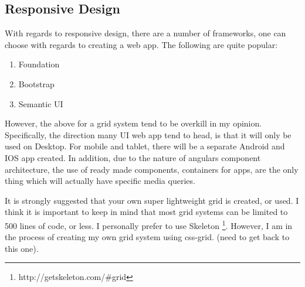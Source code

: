 \subsection{ Responsive Design }
With regards to responsive design, there are a number of frameworks, one can
choose with regards to creating a web app. The following are quite popular:
\begin{enumerate}
  \item Foundation
  \item Bootstrap
  \item Semantic UI
\end{enumerate}

However, the above for a grid system tend to be overkill in my opinion.
Specifically, the direction many UI web app tend to head, is that it will only
be used on Desktop. For mobile and tablet, there will be a separate Android and
IOS app created. In addition, due to the nature of angulars component
architecture, the use of ready made components, containers for apps, are the
only thing which will actually have specific media queries.

It is strongly suggested that your own super lightweight grid is created, or
used. I think it is important to keep in mind that most grid systems can be
limited to 500 lines of code, or less. I personally prefer to use Skeleton
\footnote{http://getskeleton.com/\#grid}. However, I am in the process of
creating my own grid system using css-grid. (need to get back to this one).
